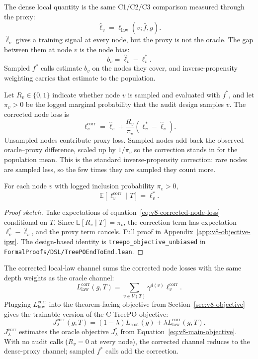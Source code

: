 The dense local quantity is the same C1/C2/C3 comparison measured
through the proxy:
\[
  \widehat\ell_v
  =
  \ell_{\mathrm{law}}(v;\widehat f,g).
\]
\(\widehat\ell_v\) gives a training signal at every node, but the
proxy is not the oracle. The gap between them at node \(v\) is the
node bias:
\[
  b_v=\widehat\ell_v-\ell_v^\ast .
\]
Sampled \(f^\ast\) calls estimate \(b_v\) on the nodes they cover, and
inverse-propensity weighting carries that estimate to the population.

Let \(R_v\in\{0,1\}\) indicate whether node \(v\) is sampled and
evaluated with \(f^\ast\), and let \(\pi_v>0\) be the logged marginal
probability that the audit design samples \(v\). The corrected node
loss is
\begin{equation}
\label{eq:v8-corrected-node-loss}
  \ell_v^{\mathrm{corr}}
  =
  \widehat\ell_v
  +
  \frac{R_v}{\pi_v}
  \left(\ell_v^\ast-\widehat\ell_v\right).
\end{equation}
Unsampled nodes contribute proxy loss. Sampled nodes add back the
observed oracle--proxy difference, scaled up by \(1/\pi_v\) so the
correction stands in for the population mean. This is the standard
inverse-propensity correction: rare nodes are sampled less, so the
few times they are sampled they count more.

\begin{proposition}\label{prop:v10-corrected-loss-unbiased}
For each node \(v\) with logged inclusion probability \(\pi_v>0\),
\[
  \mathbb E\!\left[\ell_v^{\mathrm{corr}}\mid T\right]
  =\ell_v^\ast .
\]
\end{proposition}

\begin{proof}[Proof sketch]
Take expectations of equation~\eqref{eq:v8-corrected-node-loss}
conditional on \(T\). Since
\(\mathbb E[R_v\mid T]=\pi_v\), the
correction term has expectation \(\ell_v^\ast-\widehat\ell_v\), and
the proxy term cancels. Full proof in
Appendix~\ref{app:v8-objective-ipw}. The design-based identity is
\texttt{treepo\_objective\_unbiased} in
\texttt{FormalProofs/DSL/TreePOEndToEnd.lean}.
\end{proof}

The corrected local-law channel sums the corrected node losses with
the same depth weights as the oracle channel:
\[
  L_{\mathrm{law}}^{\mathrm{corr}}(g,T)
  =
  \sum_{v\in V(T)}\gamma^{d(v)}\ell_v^{\mathrm{corr}} .
\]
Plugging \(L_{\mathrm{law}}^{\mathrm{corr}}\) into the
theorem-facing objective from Section~\ref{sec:v8-objective} gives
the trainable version of the C-TreePO objective:
\begin{equation}
\label{eq:v8-corrected-objective}
  J_\lambda^{\mathrm{corr}}(g;T)
  =
  (1-\lambda)L_{\mathrm{root}}(g)
  +
  \lambda L_{\mathrm{law}}^{\mathrm{corr}}(g,T).
\end{equation}
\(J_\lambda^{\mathrm{corr}}\) estimates the oracle objective
\(J_\lambda^\ast\) from
Equation~\eqref{eq:v8-main-objective}. With no audit calls
(\(R_v=0\) at every node), the corrected channel reduces to the
dense-proxy channel; sampled \(f^\ast\) calls add the correction.

